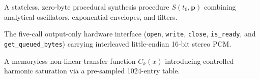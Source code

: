 \begin{description}[leftmargin=1.5em, style=nextline]
  \item[Sound Shim] A stateless, zero-byte procedural synthesis procedure $S(t_0, \mathbf{p})$ combining analytical oscillators, exponential envelopes, and filters.
  \item[VirtIO Sound Contract] The five-call output-only hardware interface (\texttt{open}, \texttt{write}, \texttt{close}, \texttt{is\_ready}, and \texttt{get\_queued\_bytes}) carrying interleaved little-endian 16-bit stereo PCM.
  \item[WaveShaper] A memoryless non-linear transfer function $C_k(x)$ introducing controlled harmonic saturation via a pre-sampled 1024-entry table.
\end{description}
